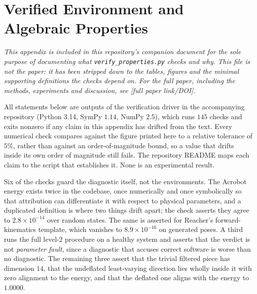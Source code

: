 \documentclass{article}
\begin{document}
\appendix

\section{Verified Environment and Algebraic Properties}
\label{app:verified}

\emph{This appendix is included in this repository's companion document for the sole purpose of documenting what \texttt{verify\_properties.py} checks and why. This file is not the paper: it has been stripped down to the tables, figures and the minimal supporting definitions the checks depend on. For the full paper, including the methods, experiments and discussion, see [full paper link/DOI].}

All statements below are outputs of the verification driver in the accompanying
repository (Python 3.14, SymPy $1.14$, NumPy $2.5$), which runs $145$ checks and
exits nonzero if any claim in this appendix has drifted from the text. Every
numerical check compares against the figure printed here to a relative
tolerance of $5\%$, rather than against an order-of-magnitude bound, so a value
that drifts inside its own order of magnitude still fails. The repository README
maps each claim to the script that establishes it. None is an experimental
result.

Six of the checks guard the diagnostic itself, not the environments. The
Acrobot energy exists twice in the codebase, once numerically and once
symbolically so that attribution can differentiate it with respect to physical
parameters, and a duplicated definition is where two things drift apart; the
check asserts they agree to $2.8\times10^{-14}$ over random states. The same is
asserted for Reacher's forward-kinematics template, which vanishes to
$8.9\times10^{-16}$ on generated poses. A third runs the full level-2 procedure
on a healthy system and asserts that the verdict is not \emph{parameter fault},
since a diagnostic that accuses correct software is worse than no diagnostic.
The remaining three assert that the trivial filtered piece has dimension $14$,
that the undeflated least-varying direction lies wholly inside it with zero
alignment to the energy, and that the deflated one aligns with the energy to
$1.0000$.
\end{document}
